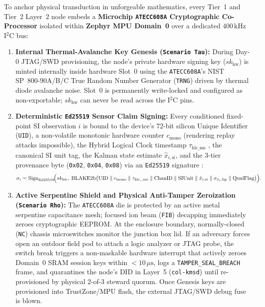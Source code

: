 To anchor physical transduction in unforgeable mathematics, every Tier~1 and Tier~2 Layer~2 node embeds a \textbf{Microchip \texttt{ATECC608A} Cryptographic Co-Processor} \parencite{microchip_atecc608a} isolated within \textbf{Zephyr MPU Domain~0} over a dedicated $400\,\mathrm{kHz}$ I$^2$C bus:
\begin{enumerate}
    \item \textbf{Internal Thermal-Avalanche Key Genesis (\texttt{Scenario Tau}):} During Day-0 JTAG/SWD provisioning, the node's private hardware signing key ($sk_{\mathrm{hw}}$) is minted internally inside hardware Slot~0 using the \texttt{ATECC608A}'s NIST SP~800-90A/B/C True Random Number Generator (\texttt{TRNG}) driven by thermal diode avalanche noise. Slot~0 is permanently write-locked and configured as non-exportable; $sk_{\mathrm{hw}}$ can never be read across the I$^2$C pins.
    \item \textbf{Deterministic \texttt{Ed25519} Sensor Claim Signing:} Every conditioned fixed-point SI observation $i$ is bound to the device's 72-bit silicon Unique Identifier (\texttt{UID}), a non-volatile monotonic hardware counter $c_{\mathrm{mono}}$ (rendering replay attacks impossible), the Hybrid Logical Clock timestamp $\tau_{\mathrm{hlc\_ms}}$ \parencite{kulkarni2014logical}, the canonical SI unit tag, the Kalman state estimate $\hat{x}_{i,\mathrm{si}}$, and the 3-tier provenance byte (\texttt{0x02}, \texttt{0x04}, \texttt{0x08}) via an \texttt{Ed25519} signature \parencite{bernstein2012ed25519}:
    \begin{equation}
        \sigma_i = \mathrm{Sign}_{\mathrm{Ed25519}}\!\Bigl(sk_{\mathrm{hw}},\; \mathrm{BLAKE2b}\bigl(\mathrm{UID} \parallel c_{\mathrm{mono}} \parallel \tau_{\mathrm{hlc\_ms}} \parallel \mathrm{ChanID} \parallel \mathrm{SIUnit} \parallel \hat{x}_{i,\mathrm{si}} \parallel \sigma_{\hat{x}_i,\mathrm{bp}} \parallel \mathrm{QualFlag}\bigr)\Bigr).
        \label{eq:l2-ed25519-claim}
    \end{equation}
    \item \textbf{Active Serpentine Shield and Physical Anti-Tamper Zeroization (\texttt{Scenario Rho}):} The \texttt{ATECC608A} die is protected by an active metal serpentine capacitance mesh; focused ion beam (\texttt{FIB}) decapping immediately zeroes cryptographic EEPROM. At the enclosure boundary, normally-closed (\texttt{NC}) chassis microswitches monitor the junction box lid. If an adversary forces open an outdoor field pod to attach a logic analyzer or JTAG probe, the switch break triggers a non-maskable hardware interrupt that actively zeroes Domain~0 SRAM session keys within $< 10\,\mu\mathrm{s}$, logs a \texttt{TAMPER\_SEAL\_BREACH} frame, and quarantines the node's DID in Layer~5 (\texttt{col-kmsd}) until re-provisioned by physical 2-of-3 steward quorum. Once Genesis keys are provisioned into TrustZone/MPU flash, the external JTAG/SWD debug fuse is blown.
\end{enumerate}

